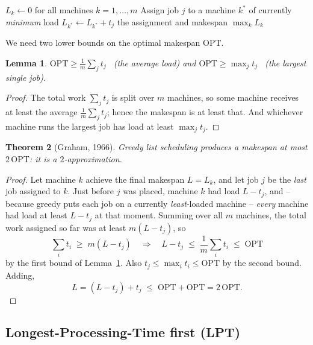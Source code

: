 \documentclass[11pt]{article}
\newtheorem{theorem}{Theorem}[section]
\newtheorem{lemma}[theorem]{Lemma}
\begin{document}
\begin{algorithm}[h]
\caption{Greedy List Scheduling (Problem 5)}
\begin{algorithmic}[1]
\State $L_k \gets 0$ for all machines $k = 1, \ldots, m$
    \State Assign job $j$ to a machine $k^\ast$ of currently \emph{minimum} load
    \State $L_{k^\ast} \gets L_{k^\ast} + t_j$
\EndFor
\State \Return the assignment and makespan $\max_k L_k$
\end{algorithmic}
\end{algorithm}

We need two lower bounds on the optimal makespan $\mathrm{OPT}$.

\begin{lemma}
\label{lem:lb}
$\mathrm{OPT} \ge \frac{1}{m}\sum_j t_j$ \ (the average load) and $\mathrm{OPT} \ge \max_j
t_j$ \ (the largest single job).
\end{lemma}

\begin{proof}
The total work $\sum_j t_j$ is split over $m$ machines, so some machine receives at least
the average $\frac{1}{m}\sum_j t_j$; hence the makespan is at least that. And whichever
machine runs the largest job has load at least $\max_j t_j$.
\end{proof}

\begin{theorem}[Graham, 1966]
\label{thm:graham}
Greedy list scheduling produces a makespan at most $2\,\mathrm{OPT}$: it is a
$2$-approximation.
\end{theorem}

\begin{proof}
Let machine $k$ achieve the final makespan $L = L_k$, and let job $j$ be the
\emph{last} job assigned to $k$. Just before $j$ was placed, machine $k$ had load $L -
t_j$, and -- because greedy puts each job on a currently \emph{least}-loaded machine --
\emph{every} machine had load at least $L - t_j$ at that moment. Summing over all $m$
machines, the total work assigned so far was at least $m(L - t_j)$, so
\[
    \sum_{i} t_i \;\ge\; m(L - t_j) \quad\Longrightarrow\quad
    L - t_j \;\le\; \frac{1}{m}\sum_i t_i \;\le\; \mathrm{OPT}
\]
by the first bound of Lemma~\ref{lem:lb}. Also $t_j \le \max_i t_i \le \mathrm{OPT}$ by
the second bound. Adding,
\[
    L = (L - t_j) + t_j \;\le\; \mathrm{OPT} + \mathrm{OPT} = 2\,\mathrm{OPT}.
\]
\end{proof}

\subsection{Longest-Processing-Time first (LPT)}
\end{document}
